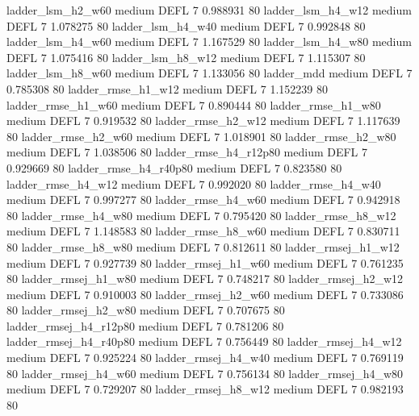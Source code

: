      ladder_lsm_h2_w60     medium     DEFL                 7 0.988931 80
     ladder_lsm_h4_w12     medium     DEFL                 7 1.078275 80
     ladder_lsm_h4_w40     medium     DEFL                 7 0.992848 80
     ladder_lsm_h4_w60     medium     DEFL                 7 1.167529 80
     ladder_lsm_h4_w80     medium     DEFL                 7 1.075416 80
     ladder_lsm_h8_w12     medium     DEFL                 7 1.115307 80
     ladder_lsm_h8_w60     medium     DEFL                 7 1.133056 80
            ladder_mdd     medium     DEFL                 7 0.785308 80
    ladder_rmse_h1_w12     medium     DEFL                 7 1.152239 80
    ladder_rmse_h1_w60     medium     DEFL                 7 0.890444 80
    ladder_rmse_h1_w80     medium     DEFL                 7 0.919532 80
    ladder_rmse_h2_w12     medium     DEFL                 7 1.117639 80
    ladder_rmse_h2_w60     medium     DEFL                 7 1.018901 80
    ladder_rmse_h2_w80     medium     DEFL                 7 1.038506 80
 ladder_rmse_h4_r12p80     medium     DEFL                 7 0.929669 80
 ladder_rmse_h4_r40p80     medium     DEFL                 7 0.823580 80
    ladder_rmse_h4_w12     medium     DEFL                 7 0.992020 80
    ladder_rmse_h4_w40     medium     DEFL                 7 0.997277 80
    ladder_rmse_h4_w60     medium     DEFL                 7 0.942918 80
    ladder_rmse_h4_w80     medium     DEFL                 7 0.795420 80
    ladder_rmse_h8_w12     medium     DEFL                 7 1.148583 80
    ladder_rmse_h8_w60     medium     DEFL                 7 0.830711 80
    ladder_rmse_h8_w80     medium     DEFL                 7 0.812611 80
   ladder_rmsej_h1_w12     medium     DEFL                 7 0.927739 80
   ladder_rmsej_h1_w60     medium     DEFL                 7 0.761235 80
   ladder_rmsej_h1_w80     medium     DEFL                 7 0.748217 80
   ladder_rmsej_h2_w12     medium     DEFL                 7 0.910003 80
   ladder_rmsej_h2_w60     medium     DEFL                 7 0.733086 80
   ladder_rmsej_h2_w80     medium     DEFL                 7 0.707675 80
ladder_rmsej_h4_r12p80     medium     DEFL                 7 0.781206 80
ladder_rmsej_h4_r40p80     medium     DEFL                 7 0.756449 80
   ladder_rmsej_h4_w12     medium     DEFL                 7 0.925224 80
   ladder_rmsej_h4_w40     medium     DEFL                 7 0.769119 80
   ladder_rmsej_h4_w60     medium     DEFL                 7 0.756134 80
   ladder_rmsej_h4_w80     medium     DEFL                 7 0.729207 80
   ladder_rmsej_h8_w12     medium     DEFL                 7 0.982193 80

